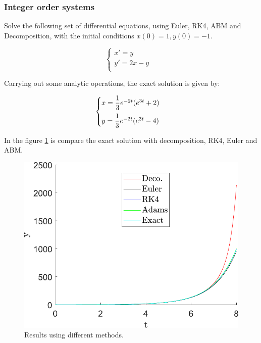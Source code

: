 \subsubsection{Integer order systems}\label{subsec:int_ord}

Solve the following set of differential equations, using Euler, RK4, ABM and Decomposition, with the initial conditions $x(0) = 1, y(0) = -1$.

\begin{equation}
    \begin{cases}
        x'= y&\\
        y'= 2x - y&\\
    \end{cases}
\end{equation}

Carrying out some analytic operations, the exact solution is given by:

\begin{equation}
    \begin{cases}
        x = \dfrac{1}{3}e^{-2t}(e^{3t}+2)&\vspace{2mm}\\
        y = 
        \dfrac{1}{3}e^{-2t}(e^{3t}-4)&\\
    \end{cases}
\end{equation}

In the figure \ref{fig:int_todos} is compare the exact solution with decomposition, RK4, Euler and ABM.

\begin{figure}[H]
    \centering
    \includegraphics[scale=0.5]{files/int_todos.pdf}
    \caption{Results using different methods.}
    \label{fig:int_todos}
\end{figure}

